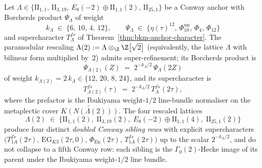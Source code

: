 \begin{theorem}
\label{thm:bkm-paramodular-rescaling-universality}
Let $\Lambda\in\{\mathrm{II}_{1,1},\,\mathrm{II}_{3,19},\,
E_8(-2)\oplus\mathrm{II}_{1,1}(2),\,\mathrm{II}_{25,1}\}$ be a Conway
anchor with Borcherds product $\Psi_\Lambda$ of weight
\[
 k_\Lambda \;\in\; \{6,\,10,\,4,\,12\},
 \qquad
 \Psi_\Lambda \;\in\;
 \{\eta(\tau)^{12},\,\Phi_{10}^{\mathrm{un}},\,\Phi_4,\,\Phi_{12}\}
\]
and supercharacter $T^{fs}_\Lambda$ of
Theorem~\ref{thm:bkm-anchor-character}. The paramodular rescaling
$\Lambda(2) := \Lambda\otimes_{\Z}\Z\bigl[\sqrt{2}\bigr]$
\textup{(}equivalently, the lattice $\Lambda$ with bilinear form
multiplied by~$2$\textup{)} admits super-refinement; its Borcherds
product is
\begin{equation}
 \Psi_{\Lambda(2)}(Z) \;=\; 2^{-k_\Lambda/2}\,\Psi_\Lambda(2Z)
 \label{eq:bkm-rescaling-Psi-identity}
\end{equation}
of weight $k_{\Lambda(2)} = 2\,k_\Lambda \in\{12,\,20,\,8,\,24\}$, and
its supercharacter is
\begin{equation}
 T^{fs}_{\Lambda(2)}(\tau)
 \;=\; 2^{-k_\Lambda/2}\,T^{fs}_\Lambda(2\tau),
 \label{eq:bkm-rescaling-character-identity}
\end{equation}
where the prefactor is the Ibukiyama weight-$1/2$ line-bundle
normaliser on the metaplectic cover $\widetilde{K(N(\Lambda(2)))}$.
The four rescaled lattices
\[
 \Lambda(2) \;\in\;
 \bigl\{\mathrm{II}_{1,1}(2),\;\mathrm{II}_{3,19}(2),\;
 E_8(-2)\oplus\mathrm{II}_{1,1}(4),\;\mathrm{II}_{25,1}(2)\bigr\}
\]
produce four distinct \emph{doubled Conway sibling rows} with
explicit supercharacters
$\bigl(T^{fs}_{1A}(2\tau),\,\mathrm{EG}_{K3}(2\tau,0),\,
\Phi_{\mathrm{En}}(2\tau),\,T^{fs}_{1A}(2\tau)\bigr)$ up to the
scalar $2^{-k_\Lambda/2}$, and do not collapse to a fifth Conway row:
each sibling is the $\Gamma_0(2)$-Hecke image of its parent under the
Ibukiyama weight-$1/2$ line bundle.
\end{theorem}

